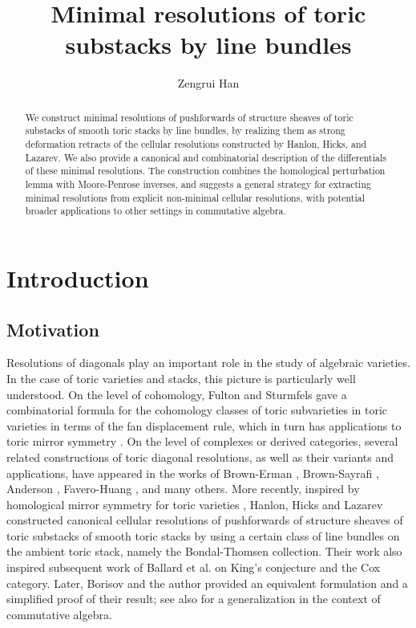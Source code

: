 \documentclass[11pt,reqno]{amsart}
\theoremstyle{definition}
\numberwithin{equation}{section}
\begin{document}
\title{Minimal resolutions of toric substacks by line bundles}

\begin{abstract}
We construct minimal resolutions of pushforwards of structure sheaves of toric substacks of smooth toric stacks by line bundles, by realizing them as strong deformation retracts of the cellular resolutions constructed by Hanlon, Hicks, and Lazarev. We also provide a canonical and combinatorial description of the differentials of these minimal resolutions. The construction combines the homological perturbation lemma with Moore-Penrose inverses, and suggests a general strategy for extracting minimal resolutions from explicit non-minimal cellular resolutions, with potential broader applications to other settings in commutative algebra.
\end{abstract}


\author{Zengrui Han}
\address{Department of Mathematics\\
University of Maryland\\
College Park, MD 20742} 


\maketitle
\tableofcontents


\section{Introduction}

\subsection{Motivation}

Resolutions of diagonals play an important role in the study of algebraic varieties. In the case of toric varieties and stacks, this picture is particularly well understood. On the level of cohomology, Fulton and Sturmfels \cite{Fulton-Sturmfels} gave a combinatorial formula for the cohomology classes of toric subvarieties in toric varieties in terms of the fan displacement rule, which in turn has applications to toric mirror symmetry \cite{BHduality,Han}. On the level of complexes or derived categories, several related constructions of toric diagonal resolutions, as well as their variants and applications, have appeared in the works of Brown-Erman \cite{BE2}, Brown-Sayrafi \cite{BS}, Anderson \cite{Anderson}, Favero-Huang \cite{FH}, and many others. More recently, inspired by homological mirror symmetry for toric varieties \cite{Bondal,FLTZ}, Hanlon, Hicks and Lazarev \cite{HHL} constructed canonical cellular resolutions of pushforwards of structure sheaves of toric substacks of smooth toric stacks by using a certain class of line bundles on the ambient toric stack, namely the Bondal-Thomsen collection. Their work also inspired subsequent work of Ballard et al. \cite{BBB+} on King's conjecture and the Cox category. Later, Borisov and the author \cite{BH} provided an equivalent formulation and a simplified proof of their result; see also \cite{BCHSY} for a generalization in the context of commutative algebra.
\end{document}
